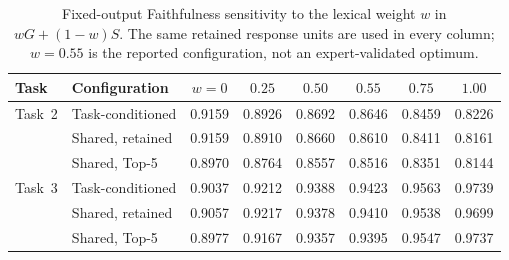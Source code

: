 \begin{table}[ht]
\centering
\scriptsize
\caption{Fixed-output Faithfulness sensitivity to the lexical weight $w$ in $wG+(1-w)S$. The same retained response units are used in every column; $w=0.55$ is the reported configuration, not an expert-validated optimum.}
\label{tab:matched-weight-sensitivity}
\setlength{\tabcolsep}{5pt}
\renewcommand{\arraystretch}{1.08}
\begin{tabular}{@{}l l c c c c c c@{}}
\toprule
\textbf{Task} & \textbf{Configuration} & $w=0$ & $0.25$ & $0.50$ & $0.55$ & $0.75$ & $1.00$ \\
\midrule
Task~2 & Task-conditioned & 0.9159 & 0.8926 & 0.8692 & 0.8646 & 0.8459 & 0.8226 \\
 & Shared, retained & 0.9159 & 0.8910 & 0.8660 & 0.8610 & 0.8411 & 0.8161 \\
 & Shared, Top-5 & 0.8970 & 0.8764 & 0.8557 & 0.8516 & 0.8351 & 0.8144 \\
\addlinespace
Task~3 & Task-conditioned & 0.9037 & 0.9212 & 0.9388 & 0.9423 & 0.9563 & 0.9739 \\
 & Shared, retained & 0.9057 & 0.9217 & 0.9378 & 0.9410 & 0.9538 & 0.9699 \\
 & Shared, Top-5 & 0.8977 & 0.9167 & 0.9357 & 0.9395 & 0.9547 & 0.9737 \\
\bottomrule
\end{tabular}
\end{table}
